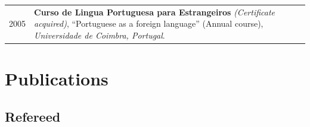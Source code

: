 \documentclass[a4paper,10pt]{article}
\def\leftcolwidth{.12\textwidth}
\def\tablevspace{10pt}
\begin{document}
\vspace{\tablevspace}

\noindent
\begin{tabularx}{\textwidth}{ p{\leftcolwidth} X }
  2005 & \textbf{Curso de Lingua Portuguesa para Estrangeiros} 
         \textit{(Certificate acquired)}, ``Portuguese as a foreign language''
         (Annual course), \textit{Universidade de Coimbra, Portugal}.
\end{tabularx}




\section*{Publications}

\subsection*{Refereed}
\end{document}
